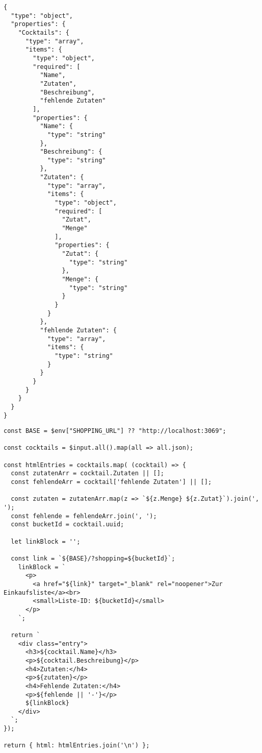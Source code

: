 \begin{listing}
\begin{verbatim}
{
  "type": "object",
  "properties": {
    "Cocktails": {
      "type": "array",
      "items": {
        "type": "object",
        "required": [
          "Name",
          "Zutaten",
          "Beschreibung",
          "fehlende Zutaten"
        ],
        "properties": {
          "Name": {
            "type": "string"
          },
          "Beschreibung": {
            "type": "string"
          },
          "Zutaten": {
            "type": "array",
            "items": {
              "type": "object",
              "required": [
                "Zutat",
                "Menge"
              ],
              "properties": {
                "Zutat": {
                  "type": "string"
                },
                "Menge": {
                  "type": "string"
                }
              }
            }
          },
          "fehlende Zutaten": {
            "type": "array",
            "items": {
              "type": "string"
            }
          }
        }
      }
    }
  }
}
\end{verbatim}
\caption{KI-Modell Antwort-Format der Rezeptvorschläge}
\label{lst:descr:js:code3}
\end{listing}

\begin{listing}
\begin{verbatim}
const BASE = $env["SHOPPING_URL"] ?? "http://localhost:3069";

const cocktails = $input.all().map(all => all.json);

const htmlEntries = cocktails.map( (cocktail) => {
  const zutatenArr = cocktail.Zutaten || [];
  const fehlendeArr = cocktail['fehlende Zutaten'] || [];

  const zutaten = zutatenArr.map(z => `${z.Menge} ${z.Zutat}`).join(', ');
  const fehlende = fehlendeArr.join(', ');
  const bucketId = cocktail.uuid;

  let linkBlock = '';

  const link = `${BASE}/?shopping=${bucketId}`;
    linkBlock = `
      <p>
        <a href="${link}" target="_blank" rel="noopener">Zur Einkaufsliste</a><br>
        <small>Liste-ID: ${bucketId}</small>
      </p>
    `;

  return `
    <div class="entry">
      <h3>${cocktail.Name}</h3>
      <p>${cocktail.Beschreibung}</p>
      <h4>Zutaten:</h4>
      <p>${zutaten}</p>
      <h4>Fehlende Zutaten:</h4>
      <p>${fehlende || '-'}</p>
      ${linkBlock}
    </div>
  `;
});

return { html: htmlEntries.join('\n') };
\end{verbatim}
\caption{JavaScript Code zur Vorbereitung der Ergebnisdarstellung}
\label{lst:descr:js:code4}
\end{listing}

